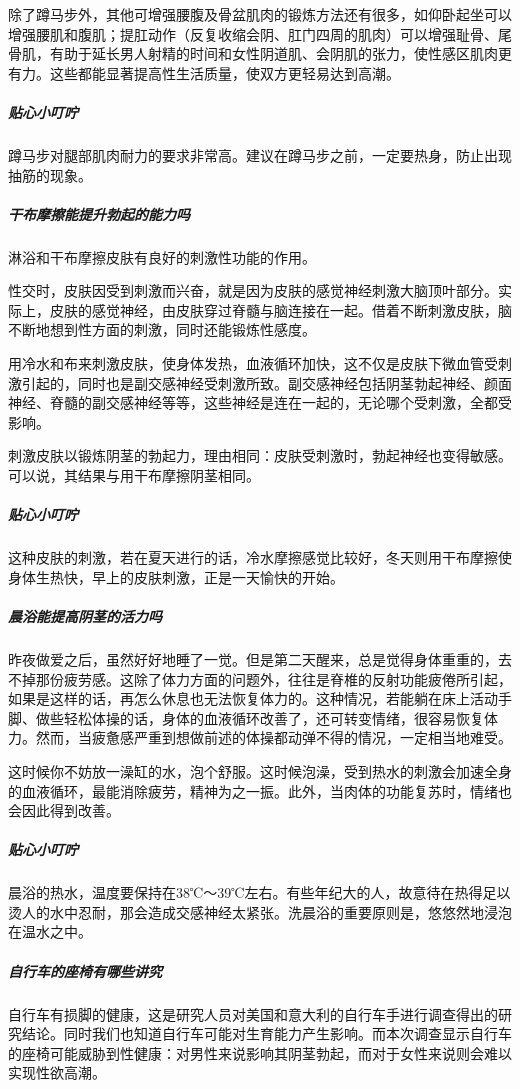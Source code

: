 除了蹲马步外，其他可增强腰腹及骨盆肌肉的锻炼方法还有很多，如仰卧起坐可以增强腰肌和腹肌；提肛动作（反复收缩会阴、肛门四周的肌肉）可以增强耻骨、尾骨肌，有助于延长男人射精的时间和女性阴道肌、会阴肌的张力，使性感区肌肉更有力。这些都能显著提高性生活质量，使双方更轻易达到高潮。

\subparagraph{贴心小叮咛}

蹲马步对腿部肌肉耐力的要求非常高。建议在蹲马步之前，一定要热身，防止出现抽筋的现象。

\subparagraph{干布摩擦能提升勃起的能力吗}

淋浴和干布摩擦皮肤有良好的刺激性功能的作用。

性交时，皮肤因受到刺激而兴奋，就是因为皮肤的感觉神经刺激大脑顶叶部分。实际上，皮肤的感觉神经，由皮肤穿过脊髓与脑连接在一起。借着不断刺激皮肤，脑不断地想到性方面的刺激，同时还能锻炼性感度。

用冷水和布来刺激皮肤，使身体发热，血液循环加快，这不仅是皮肤下微血管受刺激引起的，同时也是副交感神经受刺激所致。副交感神经包括阴茎勃起神经、颜面神经、脊髓的副交感神经等等，这些神经是连在一起的，无论哪个受刺激，全都受影响。

刺激皮肤以锻炼阴茎的勃起力，理由相同：皮肤受刺激时，勃起神经也变得敏感。可以说，其结果与用干布摩擦阴茎相同。

\subparagraph{贴心小叮咛}

这种皮肤的刺激，若在夏天进行的话，冷水摩擦感觉比较好，冬天则用干布摩擦使身体生热快，早上的皮肤刺激，正是一天愉快的开始。

\subparagraph{晨浴能提高阴茎的活力吗}

昨夜做爱之后，虽然好好地睡了一觉。但是第二天醒来，总是觉得身体重重的，去不掉那份疲劳感。这除了体力方面的问题外，往往是脊椎的反射功能疲倦所引起，如果是这样的话，再怎么休息也无法恢复体力的。这种情况，若能躺在床上活动手脚、做些轻松体操的话，身体的血液循环改善了，还可转变情绪，很容易恢复体力。然而，当疲惫感严重到想做前述的体操都动弹不得的情况，一定相当地难受。

这时候你不妨放一澡缸的水，泡个舒服。这时候泡澡，受到热水的刺激会加速全身的血液循环，最能消除疲劳，精神为之一振。此外，当肉体的功能复苏时，情绪也会因此得到改善。

\subparagraph{贴心小叮咛}

晨浴的热水，温度要保持在38℃～39℃左右。有些年纪大的人，故意待在热得足以烫人的水中忍耐，那会造成交感神经太紧张。洗晨浴的重要原则是，悠悠然地浸泡在温水之中。

\subparagraph{自行车的座椅有哪些讲究}

自行车有损脚的健康，这是研究人员对美国和意大利的自行车手进行调查得出的研究结论。同时我们也知道自行车可能对生育能力产生影响。而本次调查显示自行车的座椅可能威胁到性健康：对男性来说影响其阴茎勃起，而对于女性来说则会难以实现性欲高潮。

